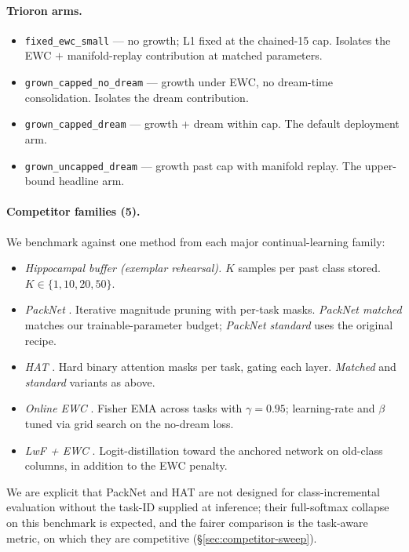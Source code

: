 \documentclass[11pt]{article}
\newcommand{\arm}[1]{\texttt{#1}}
\begin{document}
\paragraph{Trioron arms.}
\begin{itemize}[leftmargin=1.5em]
  \item \arm{fixed\_ewc\_small} --- no growth; L1 fixed at the
        chained-15 cap. Isolates the EWC $+$ manifold-replay
        contribution at matched parameters.
  \item \arm{grown\_capped\_no\_dream} --- growth under EWC, no
        dream-time consolidation. Isolates the dream contribution.
  \item \arm{grown\_capped\_dream} --- growth + dream within cap. The
        default deployment arm.
  \item \arm{grown\_uncapped\_dream} --- growth past cap with manifold
        replay. The upper-bound headline arm.
\end{itemize}

\paragraph{Competitor families (5).}
We benchmark against one method from each major continual-learning
family:
\begin{itemize}[leftmargin=1.5em]
  \item \emph{Hippocampal buffer (exemplar rehearsal).} $K$ samples
        per past class stored. $K \in \{1, 10, 20, 50\}$.
  \item \emph{PackNet} \citep{mallya2018packnet}. Iterative magnitude
        pruning with per-task masks. \emph{PackNet matched} matches
        our trainable-parameter budget; \emph{PackNet standard} uses
        the original recipe.
  \item \emph{HAT} \citep{serra2018hat}. Hard binary attention masks
        per task, gating each layer. \emph{Matched} and \emph{standard}
        variants as above.
  \item \emph{Online EWC} \citep{schwarz2018progress}. Fisher EMA
        across tasks with $\gamma = 0.95$; learning-rate and $\beta$
        tuned via grid search on the no-dream loss.
  \item \emph{LwF + EWC} \citep{li2018lwf, kirkpatrick2017overcoming}.
        Logit-distillation toward the anchored network on old-class
        columns, in addition to the EWC penalty.
\end{itemize}
We are explicit that PackNet and HAT are not designed for
class-incremental evaluation without the task-ID supplied at inference;
their full-softmax collapse on this benchmark is expected, and the
fairer comparison is the task-aware metric, on which they are
competitive (\S\ref{sec:competitor-sweep}).
\end{document}
